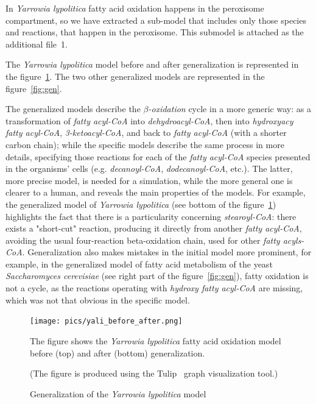 \documentclass[10pt]{bmc_article}
\newenvironment{bmcformat}{\baselineskip20pt\sloppy\setboolean{publ}{false}}{\baselineskip20pt\sloppy}
\begin{document}
\begin{bmcformat}
In \textit{Yarrowia lypolitica} fatty acid oxidation happens in the peroxisome compartment, so we have extracted a sub-model that includes only those species and reactions, that happen in the peroxisome. This submodel is attached as the additional file~1. 

The \textit{Yarrowia lypolitica} model before and after generalization is represented in the figure~\ref{fig:yali}.
The two other generalized models are represented in the figure~\ref{fig:gen}.

The generalized models describe the \textit{$\beta$-oxidation} cycle in a more generic way: as a transformation of \textit{fatty acyl-CoA} into \textit{dehydroacyl-CoA}, then into \textit{hydroxyacy fatty acyl-CoA}, \textit{3-ketoacyl-CoA}, and back to \textit{fatty acyl-CoA} (with a shorter carbon chain); while the specific models describe the same process in more details, specifying those reactions for each of the \textit{fatty acyl-CoA} species presented in the organisms' cells (e.g. \textit{decanoyl-CoA}, \textit{dodecanoyl-CoA}, etc.). The latter, more precise model, is needed for a simulation, while the more general one is clearer to a human, and reveals the main properties of the models. For example, the generalized model of  \textit{Yarrowia lypolitica} (see bottom of the figure~\ref{fig:yali}) highlights the fact that there is a particularity concerning \textit{stearoyl-CoA}: there exists a "short-cut" reaction, producing it directly from another \textit{fatty acyl-CoA}, avoiding the usual four-reaction beta-oxidation chain, used for other \textit{fatty acyls-CoA}. Generalization also makes mistakes in the initial model more prominent, for example, in the generalized model of fatty acid metabolism of the yeast \textit{Saccharomyces cerevisiae} (see right part of the figure~\ref{fig:gen}), fatty oxidation is not a cycle, as the reactions operating with \textit{hydroxy fatty acyl-CoA} are missing, which was not that obvious in the specific model.
 
\begin{figure}  
\texttt{[image: pics/yali\_before\_after.png]} 

      The figure shows the \textit{Yarrowia lypolitica} fatty acid oxidation model before (top) and after (bottom) generalization. 
      
      (The figure is produced using the Tulip~\cite{Auber04} graph visualization tool.)
\caption{Generalization of the \textit{Yarrowia lypolitica} model}
\label{fig:yali}
\end{figure}


\end{bmcformat}
\end{document}
